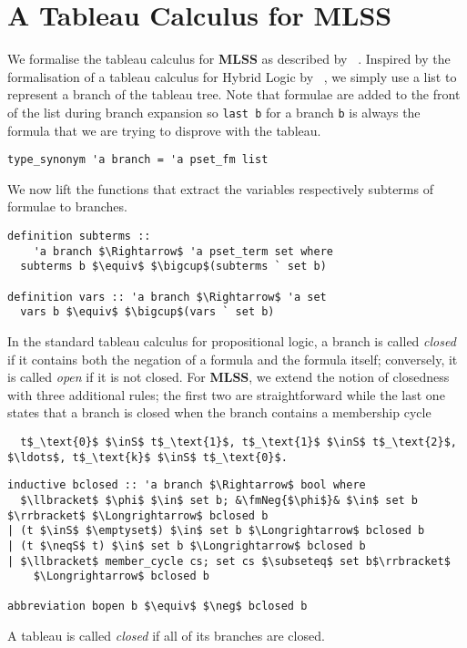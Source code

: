 \documentclass[sigplan,10pt,anonymous,review]{acmart}
\newcommand{\MLSS}{\textbf{MLSS}}
\newcommand{\inS}{\in_\text{s}}
\newcommand{\neqS}{\neq_\text{s}}
\newcommand{\fmNegSymbol}{\boldsymbol{\neg}}
\newcommand{\fmNeg}[1]{$\fmNegSymbol$ #1}
\begin{document}
\section{A Tableau Calculus for MLSS}
We formalise the tableau calculus for \MLSS{} as described by \citeauthor{new_fast_tableau}~\cite{new_fast_tableau}.
Inspired by the formalisation of a tableau calculus for Hybrid Logic by \citeauthor{hybrid_logic_afp}~\cite{hybrid_logic_afp}, we simply use a list to represent a branch of the tableau tree.
Note that formulae are added to the front of the list during branch expansion so \lstinline!last b! for a branch \lstinline!b! is always the formula that we are trying to disprove with the tableau. 
\begin{lstlisting}
type_synonym 'a branch = 'a pset_fm list
\end{lstlisting}
We now lift the functions that extract the variables respectively subterms of formulae to branches.
\begin{lstlisting}
definition subterms ::
    'a branch $\Rightarrow$ 'a pset_term set where
  subterms b $\equiv$ $\bigcup$(subterms ` set b)

definition vars :: 'a branch $\Rightarrow$ 'a set 
  vars b $\equiv$ $\bigcup$(vars ` set b)
\end{lstlisting}
In the standard tableau calculus for propositional logic, a branch is called \textit{closed} if it contains both the negation of a formula and the formula itself;
conversely, it is called \textit{open} if it is not closed.
For \MLSS{}, we extend the notion of closedness with three additional rules; the first two are straightforward while the last one states that a branch is closed when the branch contains a membership cycle
\begin{lstlisting}
  t$_\text{0}$ $\inS$ t$_\text{1}$, t$_\text{1}$ $\inS$ t$_\text{2}$, $\ldots$, t$_\text{k}$ $\inS$ t$_\text{0}$.
\end{lstlisting}

\begin{lstlisting}
inductive bclosed :: 'a branch $\Rightarrow$ bool where
  $\llbracket$ $\phi$ $\in$ set b; &\fmNeg{$\phi$}& $\in$ set b $\rrbracket$ $\Longrightarrow$ bclosed b
| (t $\inS$ $\emptyset$) $\in$ set b $\Longrightarrow$ bclosed b
| (t $\neqS$ t) $\in$ set b $\Longrightarrow$ bclosed b
| $\llbracket$ member_cycle cs; set cs $\subseteq$ set b$\rrbracket$
    $\Longrightarrow$ bclosed b

abbreviation bopen b $\equiv$ $\neg$ bclosed b
\end{lstlisting}
A tableau is called \textit{closed} if all of its branches are closed.
\end{document}
